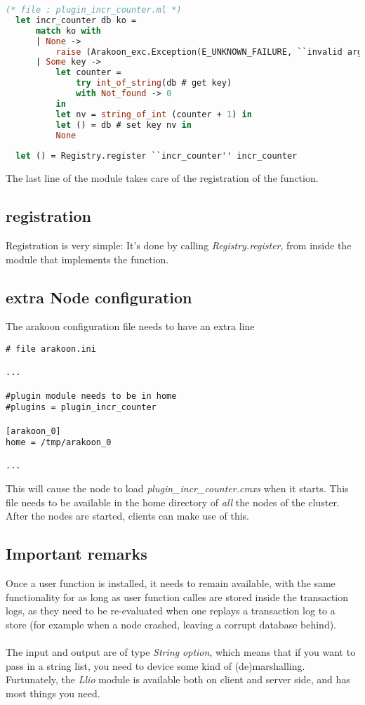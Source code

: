 \begin{lstlisting}[language=Caml]
  (* file : plugin_incr_counter.ml *)
  let incr_counter db ko = 
      match ko with
      | None -> 
          raise (Arakoon_exc.Exception(E_UNKNOWN_FAILURE, ``invalid arg''))
      | Some key -> 
          let counter = 
              try int_of_string(db # get key) 
              with Not_found -> 0 
          in
          let nv = string_of_int (counter + 1) in
          let () = db # set key nv in
          None
 
  let () = Registry.register ``incr_counter'' incr_counter
\end{lstlisting}
The last line of the module takes care of the registration of the function.
\subsection{registration}
Registration is very simple: It's done by calling \emph{Registry.register}, from inside the module that implements the function.

\subsection{extra Node configuration}
The arakoon configuration file needs to have an extra line 
\begin{verbatim}
# file arakoon.ini

...

#plugin module needs to be in home
#plugins = plugin_incr_counter

[arakoon_0]
home = /tmp/arakoon_0

...

\end{verbatim}
This will cause the node to load \emph{plugin\_incr\_counter.cmxs} when it starts. 
This file needs to be available in the home directory of \emph{all} the nodes of the cluster. After the nodes are started, clients can make use of this.

\subsection{Important remarks}
Once a user function is installed, it needs to remain available, with the same functionality for as long as user function calles are stored inside the transaction logs, as they need to be re-evaluated when one replays a transaction log to a store (for example when a node crashed, leaving a corrupt database behind).
\paragraph{}

The input and output are of type \emph{String option}, which means that if you want to pass in a string list, you need to device some kind of (de)marshalling. 
Furtunately, the \emph{Llio} module is available both on client and server side, and has most things you need.
